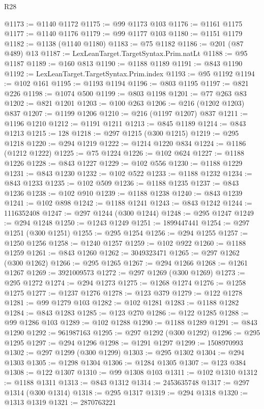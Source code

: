 \begin{lexlean}{R28}
\begin{coremodule}
@1173 := @1140 @1172
@1175 := @99 @1173 @103
@1176 := @1161 @1175
@1177 := @1140 @1176
@1179 := @99 @1177 @103
@1180 := @1151 @1179
@1182 := @1138 (@1140 @1180)
@1183 := @75 @1182
@1186 := @201 (@87 @489) @13
@1187 := LexLeanTarget.TargetSyntax.Prim.natLt
@1188 := @95 @1187
@1189 := @160 @813
@1190 := @1188 @1189
@1191 := @843 @1190
@1192 := LexLeanTarget.TargetSyntax.Prim.index
@1193 := @95 @1192
@1194 := @102 @161
@1195 := @1193 @1194
@1196 := @803 @1195
@1197 := @821 @226
@1198 := @1074 @500
@1199 := @803 @1198
@1201 := @77 @263 @83
@1202 := @821 @1201
@1203 := @100 @263
@1206 := @216 (@1202 @1203) @837
@1207 := @1199 @1206
@1210 := @216 (@1197 @1207) @837
@1211 := @1196 @1210
@1212 := @1191 @1211
@1213 := @845 @1189
@1214 := @843 @1213
@1215 := 128
@1218 := @297 @1215 (@300 @1215)
@1219 := @295 @1218
@1220 := @294 @1219
@1222 := @1214 @1220 @834
@1224 := @1186 (@1212 @1222)
@1225 := @75 @1224
@1226 := @102 @624
@1227 := @1188 @1226
@1228 := @843 @1227
@1229 := @102 @556
@1230 := @1188 @1229
@1231 := @843 @1230
@1232 := @102 @522
@1233 := @1188 @1232
@1234 := @843 @1233
@1235 := @102 @509
@1236 := @1188 @1235
@1237 := @843 @1236
@1238 := @102 @910
@1239 := @1188 @1238
@1240 := @843 @1239
@1241 := @102 @898
@1242 := @1188 @1241
@1243 := @843 @1242
@1244 := 1116352408
@1247 := @297 @1244 (@300 @1244)
@1248 := @295 @1247
@1249 := @294 @1248
@1250 := @1243 @1249
@1251 := 1899447441
@1254 := @297 @1251 (@300 @1251)
@1255 := @295 @1254
@1256 := @294 @1255
@1257 := @1250 @1256
@1258 := @1240 @1257
@1259 := @102 @922
@1260 := @1188 @1259
@1261 := @843 @1260
@1262 := 3049323471
@1265 := @297 @1262 (@300 @1262)
@1266 := @295 @1265
@1267 := @294 @1266
@1268 := @1261 @1267
@1269 := 3921009573
@1272 := @297 @1269 (@300 @1269)
@1273 := @295 @1272
@1274 := @294 @1273
@1275 := @1268 @1274
@1276 := @1258 @1275
@1277 := @1237 @1276
@1278 := @123 @379
@1279 := @122 @1278
@1281 := @99 @1279 @103
@1282 := @102 @1281
@1283 := @1188 @1282
@1284 := @843 @1283
@1285 := @123 @270
@1286 := @122 @1285
@1288 := @99 @1286 @103
@1289 := @102 @1288
@1290 := @1188 @1289
@1291 := @843 @1290
@1292 := 961987163
@1295 := @297 @1292 (@300 @1292)
@1296 := @295 @1295
@1297 := @294 @1296
@1298 := @1291 @1297
@1299 := 1508970993
@1302 := @297 @1299 (@300 @1299)
@1303 := @295 @1302
@1304 := @294 @1303
@1305 := @1298 @1304
@1306 := @1284 @1305
@1307 := @123 @384
@1308 := @122 @1307
@1310 := @99 @1308 @103
@1311 := @102 @1310
@1312 := @1188 @1311
@1313 := @843 @1312
@1314 := 2453635748
@1317 := @297 @1314 (@300 @1314)
@1318 := @295 @1317
@1319 := @294 @1318
@1320 := @1313 @1319
@1321 := 2870763221

\end{coremodule}
\end{lexlean}
